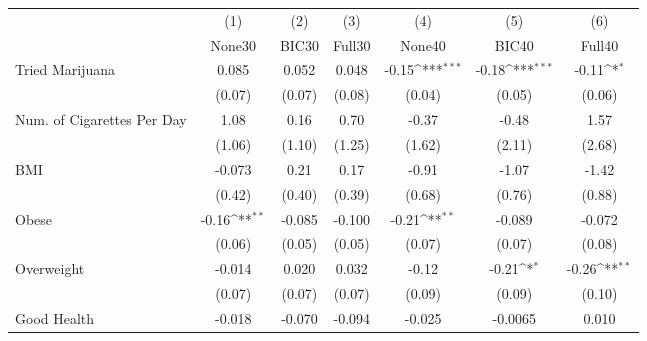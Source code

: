 {
\def\sym#1{\ifmmode^{#1}\else\(^{#1}\)\fi}
\begin{tabular}{l*{6}{c}}
\toprule
            &\multicolumn{1}{c}{(1)}&\multicolumn{1}{c}{(2)}&\multicolumn{1}{c}{(3)}&\multicolumn{1}{c}{(4)}&\multicolumn{1}{c}{(5)}&\multicolumn{1}{c}{(6)}\\
            &\multicolumn{1}{c}{None30}&\multicolumn{1}{c}{BIC30}&\multicolumn{1}{c}{Full30}&\multicolumn{1}{c}{None40}&\multicolumn{1}{c}{BIC40}&\multicolumn{1}{c}{Full40}\\
\midrule
Tried Marijuana&       0.085         &       0.052         &       0.048         &       -0.15\sym{***}&       -0.18\sym{***}&       -0.11\sym{*}  \\
            &      (0.07)         &      (0.07)         &      (0.08)         &      (0.04)         &      (0.05)         &      (0.06)         \\
\addlinespace
Num. of Cigarettes Per Day&        1.08         &        0.16         &        0.70         &       -0.37         &       -0.48         &        1.57         \\
            &      (1.06)         &      (1.10)         &      (1.25)         &      (1.62)         &      (2.11)         &      (2.68)         \\
\addlinespace
BMI         &      -0.073         &        0.21         &        0.17         &       -0.91         &       -1.07         &       -1.42         \\
            &      (0.42)         &      (0.40)         &      (0.39)         &      (0.68)         &      (0.76)         &      (0.88)         \\
\addlinespace
Obese       &       -0.16\sym{**} &      -0.085         &      -0.100         &       -0.21\sym{**} &      -0.089         &      -0.072         \\
            &      (0.06)         &      (0.05)         &      (0.05)         &      (0.07)         &      (0.07)         &      (0.08)         \\
\addlinespace
Overweight  &      -0.014         &       0.020         &       0.032         &       -0.12         &       -0.21\sym{*}  &       -0.26\sym{**} \\
            &      (0.07)         &      (0.07)         &      (0.07)         &      (0.09)         &      (0.09)         &      (0.10)         \\
\addlinespace
Good Health &      -0.018         &      -0.070         &      -0.094         &      -0.025         &     -0.0065         &       0.010         \\

\end{tabular}}
